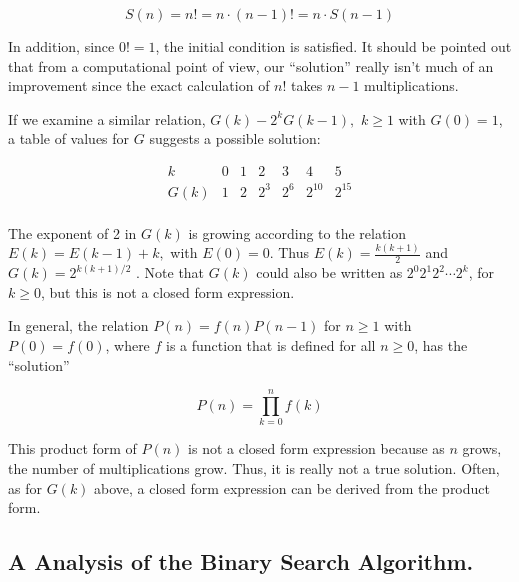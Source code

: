 \documentclass[10pt,]{book}
\theoremstyle{plain}
\theoremstyle{definition}
\theoremstyle{definition}
\theoremstyle{definition}
\theoremstyle{definition}
\numberwithin{equation}{section}
\begin{document}
\[S(n) = n! = n \cdot (n -1)! = n\cdot  S(n - 1)\]

In addition, since \(0! = 1\), the initial condition is satisfied. It should be pointed out that from a computational point of view, our ``solution''
really isn't much of an improvement since the exact calculation of \(n!\) takes \(n-1\) multiplications.%
\par
If we examine a similar relation, \(G(k) - 2 ^k G(k - 1),\) \(k\geq 1\) with \(G(0) = 1\), a table of values for \(G\) suggests a possible solution:

 \[\begin{array}{ccccccc}
 k & 0 & 1 & 2 & 3 & 4 & 5 \\
\hline
 G(k) & 1 & 2 & 2^3 & 2^6 & 2^{10} & 2^{15} \\
\end{array}\]

The exponent of 2 in \(G(k)\) is growing according to the relation \(E(k) = E(k - 1) + k,\) with \(E(0) = 0\). Thus \(E(k)=\frac{k(k+1)}{2}\)
and \(G(k) = 2^{k(k+1)/2}\) . Note that \(G(k)\) could also be written as \(2^0 2^1 2^2 \cdots 2^k\), for \(k \geq  0\), but this is not a closed form expression.%
\par
In general, the relation \(P(n) = f(n)P(n - 1)\) for \(n \geq 1\) with \(P(0) =f(0)\), where \(f\) is a function that is defined for all \(n\geq
0\), has the ``solution''


\[P(n)=\prod _{k=0}^n f(k)\]


This product form of \(P(n)\) is not a closed form expression because as \(n\) grows, the number of multiplications grow. Thus, it is really not a true solution.  Often, as for \(G(k)\) above, a closed form expression can be derived from the product form.%
\typeout{************************************************}
\typeout{************************************************}
\subsection[A Analysis of the Binary Search Algorithm.]{A Analysis of the Binary Search Algorithm.}\label{analysis-of-binary-search}
\typeout{************************************************}
\typeout{************************************************}
\end{document}
